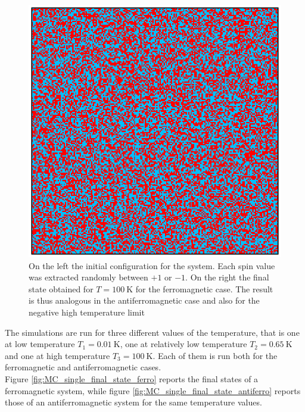\begin{figure}
\begin{minipage}[c]{0.45\textwidth}
        \includegraphics[scale=0.38]{./images/ising/T_100_ferro.eps}
    \end{minipage}
    \caption{On the left the initial configuration for the system. Each spin value was extracted randomly between $+1$ or $-1$. On the right the final state obtained for $T = \SI{100}{\kelvin}$
    for the ferromagnetic case. The result is thus analogous in the antiferromagnetic case and also for the negative high temperature limit}
    \label{fig:initial_configuration}
\end{figure}
The simulations are run for three different values of the temperature, that is one at low temperature $T_1 = \SI{0.01}{\kelvin}$, one at relatively low temperature $T_2 = \SI{0.65}{\kelvin}$ and one at high temperature $T_3 = \SI{100}{\kelvin}$. Each of them is run both 
for the ferromagnetic and antiferromagnetic cases. \\
Figure \ref{fig:MC_single_final_state_ferro} reports the final states of a ferromagnetic system, while
figure \ref{fig:MC_single_final_state_antiferro} reports those of an antiferromagnetic system for the same temperature values. \\
